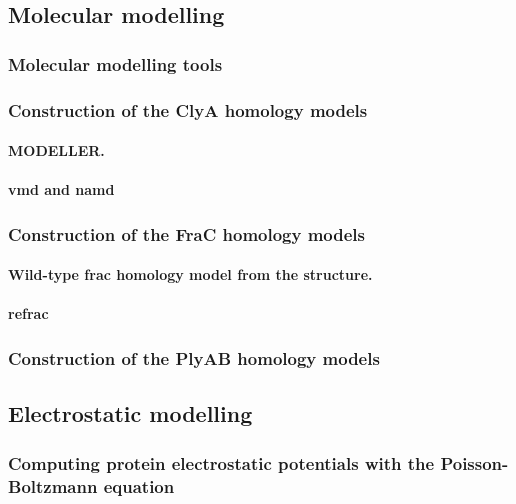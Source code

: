 \subsection{Molecular modelling}
%

\subsubsection{Molecular modelling tools}
%

\subsubsection{Construction of the ClyA homology models}


\paragraph{MODELLER.}

\paragraph{ \gls{vmd} and \gls{namd}}

\subsubsection{Construction of the FraC homology models}
%

\paragraph{Wild-type \gls{frac} homology model from the  structure.}

\paragraph{\gls{refrac}}

\subsubsection{Construction of the PlyAB homology models}


\subsection{Electrostatic modelling}
%

\subsubsection{Computing protein electrostatic potentials with the Poisson-Boltzmann equation}
%

